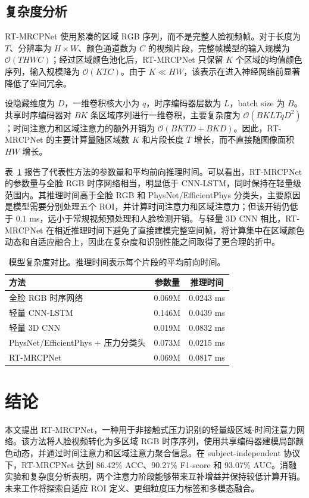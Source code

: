 \documentclass[runningheads]{llncs}
\begin{document}
\subsection{复杂度分析}

RT-MRCPNet 使用紧凑的区域 RGB 序列，而不是完整人脸视频帧。对于长度为 $T$、分辨率为 $H \times W$、颜色通道数为 $C$ 的视频片段，完整帧模型的输入规模为 $\mathcal{O}(T H W C)$；经过区域颜色池化后，RT-MRCPNet 只保留 $K$ 个区域的均值颜色序列，输入规模降为 $\mathcal{O}(K T C)$。由于 $K \ll H W$，该表示在进入神经网络前显著降低了空间冗余。

设隐藏维度为 $D$，一维卷积核大小为 $q$，时序编码器层数为 $L$，batch size 为 $B$。共享时序编码器对 $B K$ 条区域序列进行一维卷积，主要复杂度为 $\mathcal{O}(B K L T q D^2)$；时间注意力和区域注意力的额外开销为 $\mathcal{O}(B K T D + B K D)$。因此，RT-MRCPNet 的主要计算量随区域数 $K$ 和片段长度 $T$ 增长，而不直接随图像面积 $H W$ 增长。

表~\ref{tab:complexity_zh} 报告了代表性方法的参数量和平均前向推理时间。可以看出，RT-MRCPNet 的参数量与全脸 RGB 时序网络相当，明显低于 CNN-LSTM，同时保持在轻量级范围内。其推理时间高于全脸 RGB 和 PhysNet/EfficientPhys 分类头，主要原因是模型需要分别处理五个 ROI，并计算时间注意力和区域注意力；但该开销仍低于 $0.1$ ms，远小于常规视频预处理和人脸检测开销。与轻量 3D CNN 相比，RT-MRCPNet 在相近推理时间下避免了直接建模完整空间帧，将计算集中在区域颜色动态和自适应融合上，因此在复杂度和识别性能之间取得了更合理的折中。

\begin{table}
\caption{模型复杂度对比。推理时间表示每个片段的平均前向时间。}
\label{tab:complexity_zh}
\centering
\begin{tabular}{lcc}
\toprule
方法 & 参数量 & 推理时间 \\
\midrule
全脸 RGB 时序网络 & 0.069M & 0.0243 ms \\
轻量 CNN-LSTM & 0.146M & 0.0439 ms \\
轻量 3D CNN & 0.019M & 0.0832 ms \\
PhysNet/EfficientPhys + 压力分类头 & 0.073M & 0.0215 ms \\
RT-MRCPNet & 0.069M & 0.0817 ms \\
\bottomrule
\end{tabular}
\end{table}

\section{结论}

本文提出 RT-MRCPNet，一种用于非接触式压力识别的轻量级区域-时间注意力网络。该方法将人脸视频转化为多区域 RGB 时序序列，使用共享编码器建模局部颜色动态，并通过时间注意力和区域注意力聚合信息。在 subject-independent 协议下，RT-MRCPNet 达到 86.42\% ACC、90.27\% F1-score 和 93.07\% AUC。消融实验和复杂度分析表明，两个注意力阶段能够带来互补增益并保持较低计算开销。未来工作将探索自适应 ROI 定义、更细粒度压力标签和多模态融合。

\begingroup


\endgroup
\end{document}
